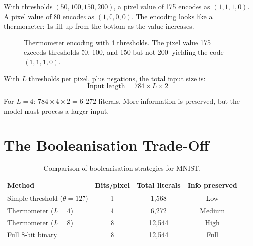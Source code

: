 \begin{example}
With thresholds $(50, 100, 150, 200)$, a pixel value of 175 encodes
as $(1, 1, 1, 0)$. A pixel value of 80 encodes as $(1, 0, 0, 0)$.
The encoding looks like a thermometer: 1s fill up from the bottom as
the value increases.
\end{example}

\begin{figure}[htbp]
\centering
{}
\caption{Thermometer encoding with 4 thresholds. The pixel value 175
  exceeds thresholds 50, 100, and 150 but not 200, yielding the code
  $(1, 1, 1, 0)$.}
\label{fig:thermometer}
\end{figure}

With $L$ thresholds per pixel, plus negations, the total input size is:
\begin{equation}
  \text{Input length} = 784 \times L \times 2
  \label{eq:thermo-size}
\end{equation}

For $L = 4$: $784 \times 4 \times 2 = 6{,}272$ literals. More
information is preserved, but the model must process a larger input.


\section{The Booleanisation Trade-Off}
\label{sec:bool-tradeoff}

\begin{table}[htbp]
\centering
\caption{Comparison of booleanisation strategies for MNIST.}
\label{tab:bool-comparison}
\begin{tabular}{@{}lccc@{}}
  \toprule
  \textbf{Method} & \textbf{Bits/pixel} & \textbf{Total literals}
    & \textbf{Info preserved} \\
  \midrule
  Simple threshold ($\theta = 127$) & 1 & 1{,}568 & Low \\
  Thermometer ($L = 4$) & 4 & 6{,}272 & Medium \\
  Thermometer ($L = 8$) & 8 & 12{,}544 & High \\
  Full 8-bit binary    & 8 & 12{,}544 & Full \\
  \bottomrule
\end{tabular}
\end{table}

